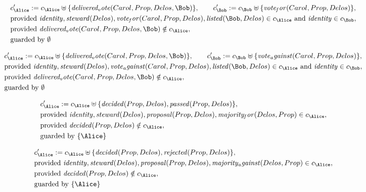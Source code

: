 \begin{align*}
&
c'_
{
\Alice
}
 := 
c_
{
\Alice
}
 \uplus 
\{
\mathit{
delivered_vote
}
(
Carol
,
Prop
,
Delos
,
\Bob
)
\}
, \qquad 
c'_
{
\Bob
}
 := 
c_
{
\Bob
}
 \uplus 
\{
\mathit{
vote_for
}
(
Carol
,
Prop
,
Delos
)
\}
,\\
&
\text{provided } 
\mathit{
identity
}
,
\mathit{
steward
}
(
Delos
)
,
\mathit{
vote_for
}
(
Carol
,
Prop
,
Delos
)
,
\mathit{
listed
}
(
\Bob
,
Delos
)
 \in c_
{
\Alice
}
 \text{ and } 
\mathit{
identity
}
 \in c_
{
\Bob
}
,\\
&
\text{provided } 
\mathit{
delivered_vote
}
(
Carol
,
Prop
,
Delos
,
\Bob
)
 \notin c_
{
\Alice
}
,\\
&
\text{guarded by } \emptyset
\end{align*}

\begin{align*}
&
c'_
{
\Alice
}
 := 
c_
{
\Alice
}
 \uplus 
\{
\mathit{
delivered_vote
}
(
Carol
,
Prop
,
Delos
,
\Bob
)
\}
, \qquad 
c'_
{
\Bob
}
 := 
c_
{
\Bob
}
 \uplus 
\{
\mathit{
vote_against
}
(
Carol
,
Prop
,
Delos
)
\}
,\\
&
\text{provided } 
\mathit{
identity
}
,
\mathit{
steward
}
(
Delos
)
,
\mathit{
vote_against
}
(
Carol
,
Prop
,
Delos
)
,
\mathit{
listed
}
(
\Bob
,
Delos
)
 \in c_
{
\Alice
}
 \text{ and } 
\mathit{
identity
}
 \in c_
{
\Bob
}
,\\
&
\text{provided } 
\mathit{
delivered_vote
}
(
Carol
,
Prop
,
Delos
,
\Bob
)
 \notin c_
{
\Alice
}
,\\
&
\text{guarded by } \emptyset
\end{align*}

\begin{align*}
&
c'_
{
\Alice
}
 := 
c_
{
\Alice
}
 \uplus 
\{
\mathit{
decided
}
(
Prop
,
Delos
)
,
\mathit{
passed
}
(
Prop
,
Delos
)
\}
,\\
&
\text{provided } 
\mathit{
identity
}
,
\mathit{
steward
}
(
Delos
)
,
\mathit{
proposal
}
(
Prop
,
Delos
)
,
\mathit{
majority_for
}
(
Delos
,
Prop
)
 \in c_
{
\Alice
}
,\\
&
\text{provided } 
\mathit{
decided
}
(
Prop
,
Delos
)
 \notin c_
{
\Alice
}
,\\
&
\text{guarded by } \{
\Alice
\}
\end{align*}

\begin{align*}
&
c'_
{
\Alice
}
 := 
c_
{
\Alice
}
 \uplus 
\{
\mathit{
decided
}
(
Prop
,
Delos
)
,
\mathit{
rejected
}
(
Prop
,
Delos
)
\}
,\\
&
\text{provided } 
\mathit{
identity
}
,
\mathit{
steward
}
(
Delos
)
,
\mathit{
proposal
}
(
Prop
,
Delos
)
,
\mathit{
majority_against
}
(
Delos
,
Prop
)
 \in c_
{
\Alice
}
,\\
&
\text{provided } 
\mathit{
decided
}
(
Prop
,
Delos
)
 \notin c_
{
\Alice
}
,\\
&
\text{guarded by } \{
\Alice
\}
\end{align*}
